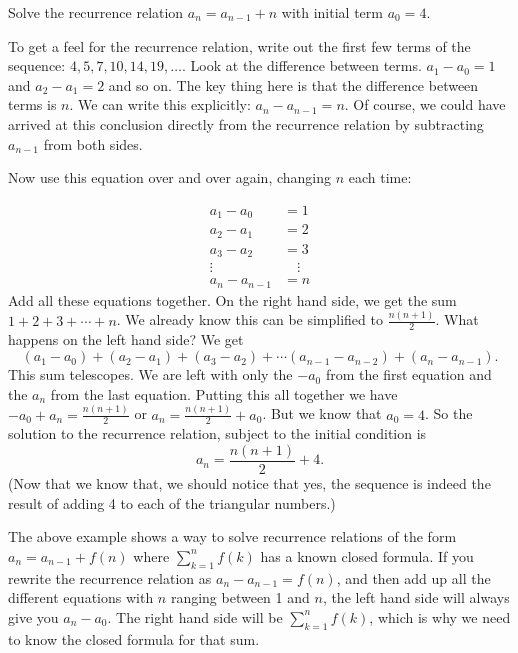 \documentclass[12pt]{article}
\begin{document}
\begin{example}
  Solve the recurrence relation $a_n = a_{n-1} + n$ with initial term $a_0 = 4$.  
  
  \begin{solution}
    To get a feel for the recurrence relation, write out the first few terms of the sequence: $4, 5, 7, 10, 14, 19, \ldots$.  Look at the difference between terms.  $a_1 - a_0 = 1$ and $a_2 - a_1 = 2$ and so on.  The key thing here is that the difference between terms is $n$.  We can write this explicitly: $a_n - a_{n-1} = n$.  Of course, we could have arrived at this conclusion directly from the recurrence relation by subtracting $a_{n-1}$ from both sides.
    
    Now use this equation over and over again, changing $n$ each time:
    
    \begin{align*}
      a_1 - a_0 &= 1\\
      a_2 - a_1 &= 2\\
      a_3 - a_2 & = 3\\
      \vdots \quad & \quad \vdots \\
      a_n - a_{n-1} & = n
    \end{align*}
  Add all these equations together.  On the right hand side, we get the sum $1 + 2 + 3 + \cdots + n$.  We already know this can be simplified to $\frac{n(n+1)}{2}$.  What happens on the left hand side?  We get 
  \[(a_1 - a_0) + (a_2 - a_1) + (a_3 - a_2) + \cdots (a_{n-1} - a_{n-2})+ (a_n - a_{n-1}).\]
  This sum telescopes.  We are left with only the $-a_0$ from the first equation and the $a_n$ from the last equation.  Putting this all together we have $-a_0 + a_n = \frac{n(n+1)}{2}$ or $a_n = \frac{n(n+1)}{2} + a_0$.  But we know that $a_0 = 4$.  So the solution to the recurrence relation, subject to the initial condition is
  \[a_n = \frac{n(n+1)}{2} + 4.\]
  (Now that we know that, we should notice that yes, the sequence is indeed the result of adding 4 to each of the triangular numbers.)
  \end{solution}

\end{example}

The above example shows a way to solve recurrence relations of the form $a_n = a_{n-1} + f(n)$ where $\sum_{k = 1}^n f(k)$ has a known closed formula.  If you rewrite the recurrence relation as $a_n - a_{n-1} = f(n)$, and then add up all the different equations with $n$ ranging between 1 and $n$, the left hand side will always give you $a_n - a_0$.  The right hand side will be $\sum_{k = 1}^n f(k)$, which is why we need to know the closed formula for that sum.
\end{document}
